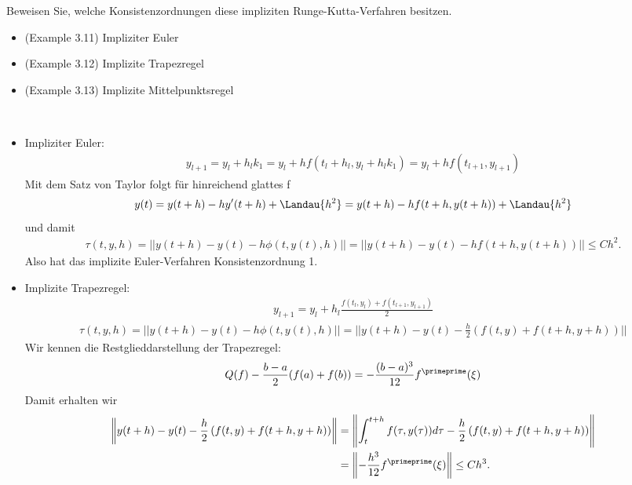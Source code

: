 \begin{exercise}
Beweisen Sie, welche Konsistenzordnungen diese impliziten Runge-Kutta-Verfahren besitzen.
\begin{itemize}
  \item (Example 3.11) Impliziter Euler
  \item (Example 3.12) Implizite Trapezregel
  \item (Example 3.13) Implizite Mittelpunktsregel
\end{itemize}
\end{exercise}
\begin{solution}
\leavevmode \\
\begin{itemize}
  \item Impliziter Euler:
  \begin{align*}
    y_{l+1} = y_l + h_lk_1 = y_l + hf(t_l+h_l,y_l+h_lk_1) = y_l + hf(t_{l+1},y_{l+1})
  \end{align*}
  Mit dem Satz von Taylor folgt für hinreichend glattes f
  \begin{align*}
    y(t) = y(t+h) - hy^{\prime}(t+h) + \Landau{h^2} =
    y(t+h) - hf(t+h,y(t+h)) + \Landau{h^2}
  \end{align*}
  und damit
  \begin{align*}
    \tau(t,y,h) = ||y(t+h) - y(t) - h\phi(t,y(t),h)|| =
    ||y(t+h) - y(t) - hf(t + h,y(t+h))|| \leq Ch^2.
  \end{align*}
  Also hat das implizite Euler-Verfahren Konsistenzordnung 1.
  \item Implizite Trapezregel:
  \begin{align*}
    y_{l+1} = y_l + h_l\frac{f(t_l,y_l) + f(t_{l+1},y_{l+1})}{2}
  \end{align*}
  \begin{align*}
    \tau(t,y,h) = ||y(t+h) - y(t) - h\phi(t,y(t),h)|| =
    ||y(t+h) - y(t) - \frac{h}{2}\left(f(t,y) + f(t+h,y+h)\right)||
  \end{align*}
  Wir kennen die Restglieddarstellung der Trapezregel:
  \begin{align*}
    Q(f) - \frac{b-a}{2}(f(a)+f(b)) = -\frac{(b-a)^3}{12}f^{\primeprime}(\xi)
  \end{align*}
  Damit erhalten wir
  \begin{align*}
  \left\|y(t+h) - y(t) - \frac{h}{2}\left(f(t,y) + f(t+h,y+h)\right)\right\|
  &= \left\|\int_{t}^{t+h}f(\tau,y(\tau))d\tau - \frac{h}{2}\left(f(t,y) + f(t+h,y+h)\right)\right\| \\
  &= \left\|-\frac{h^3}{12}f^{\primeprime}(\xi)\right\| \leq Ch^3.

\end{align*}
\end{itemize}
\end{solution}
